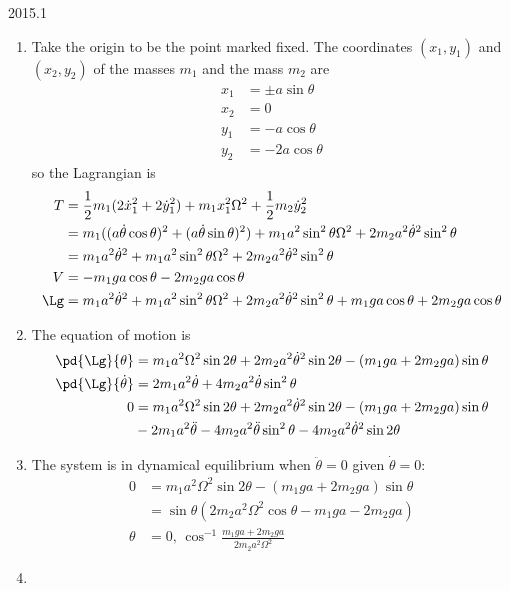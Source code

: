 \documentclass[12pt]{article}
\begin{document}
\begin{solution}{2015.1}
  \begin{enumerate}
    \item Take the origin to be the point marked fixed.
    The coordinates $(x_1, y_1)$ and $(x_2, y_2)$ of the masses $m_1$ and the mass $m_2$ are
    \begin{align*}
      x_1 & = \pm a \sin \theta \\
      x_2 & = 0 \\
      y_1 & = -a \cos \theta \\
      y_2 & = -2a \cos \theta
    \end{align*}
    so the Lagrangian is
    \begin{align*}
      T & = \frac{1}{2} m_1 (2\dot{x}_1^2 + 2\dot{y}_1^2) + m_1 x_1^2 \Omega^2 + \frac{1}{2} m_2 \dot{y}_2^2 \\
      & = m_1 ((a \dot{\theta} \cos \theta)^2 + (a \dot{\theta} \sin \theta)^2) + m_1 a^2 \sin^2 \theta \Omega^2 + 2m_2 a^2 \dot{\theta}^2 \sin^2 \theta \\
      & = m_1 a^2 \dot{\theta}^2 + m_1 a^2 \sin^2 \theta \Omega^2 + 2m_2 a^2 \dot{\theta}^2 \sin^2 \theta \\
      V & = -m_1 g a \cos \theta - 2m_2 g a \cos \theta \\
      \Lg & = m_1 a^2 \dot{\theta}^2 + m_1 a^2 \sin^2 \theta \Omega^2 + 2m_2 a^2 \dot{\theta}^2 \sin^2 \theta + m_1 g a \cos \theta + 2m_2 g a \cos \theta \\
    \end{align*}

    \item
    The equation of motion is
    \begin{align*}
      \pd{\Lg}{\theta} & = m_1 a^2 \Omega^2 \sin 2\theta + 2m_2 a^2 \dot{\theta}^2 \sin 2\theta - (m_1 g a + 2m_2 g a) \sin \theta \\
      \pd{\Lg}{\dot{\theta}} & = 2m_1 a^2 \dot{\theta} + 4m_2 a^2 \dot{\theta} \sin^2 \theta \\
      0 & = m_1 a^2 \Omega^2 \sin 2\theta + 2m_2 a^2 \dot{\theta}^2 \sin 2\theta - (m_1 g a + 2m_2 g a) \sin \theta \\
        &   - 2m_1 a^2 \ddot{\theta} - 4m_2 a^2 \ddot{\theta} \sin^2 \theta - 4m_2 a^2 \dot{\theta}^2 \sin 2\theta \\
    \end{align*}

    \item
    The system is in dynamical equilibrium when $\ddot{\theta} = 0$ given $\dot{\theta} = 0$:
    \begin{align*}
      0 & = m_1 a^2 \Omega^2 \sin 2\theta - (m_1 g a + 2m_2 g a) \sin \theta \\
      & = \sin \theta ( 2m_2 a^2 \Omega^2 \cos \theta - m_1 g a - 2m_2 ga) \\
      \theta & = 0, \, \cos^{-1} \frac{m_1 g a + 2m_2 ga}{2m_2 a^2 \Omega^2}
    \end{align*}

    \item


  \end{enumerate}
\end{solution}
\end{document}
